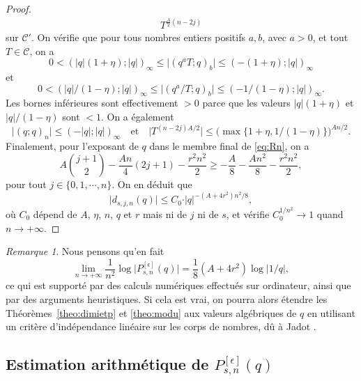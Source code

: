 \documentclass[12pt]{amsart}
\newcommand{\io}{\infty}
\newcommand{\ep}{\epsilon}
\theoremstyle{remark}
\newtheorem*{remark}{Remarque}
\numberwithin{equation}{section}
\begin{document}
\begin{proof}
\begin{align}
 T^{ \frac{A }{2}(n-2 j) } 
\end{align}
sur $\mathcal{C'}$. On v{\'e}rifie que pour tous nombres entiers positifs
$a,b$, avec $a>0$, et tout $T\in\mathcal{C}$, on a  
$$
0<(\vert q\vert(1+\eta);\vert q\vert)_\infty\le
\vert(q^aT;q)_b\vert\le (-(1+\eta);\vert q\vert)_\infty
$$
et
$$
0<(\vert q\vert/(1-\eta);\vert q\vert)_\infty\le
\vert(q^a/T;q)_b\vert\le (-1/(1-\eta);\vert q\vert)_\infty.
$$
Les bornes inf{\'e}rieures sont effectivement $>0$ parce que les
valeurs $\vert q\vert(1+\eta)$ et $\vert q\vert/(1-\eta)$ sont $<1$.
On a {\'e}galement  
$$
\vert (q;q)_n\vert\le (-\vert q\vert;\vert q\vert)_\infty\quad
\text{et}\quad 
\vert T^{(n-2j)A/2}\vert \le \bigl(\max\{1+\eta,1/(1-\eta)\}\bigr)^{An/2}.
$$
Finalement, pour l'exposant de $q$ dans le membre final de 
\eqref{eq:Rn}, on a
$$A\binom {j+1}2- \frac{A n}{4} (2j+1) - \frac{ r^2n^2}{2}\ge 
-\frac {A} {8}-\frac {An^2} {8}- \frac{ r^2n^2}{2},$$
pour tout $j\in\{0,1, \cdots, n\}$. 
On en d{\'e}duit que 
$$
\vert d_{s,j,n}(q)\vert \le 
C_0\cdot\vert q\vert^{-(A+4r^2)n^2/8},
$$
o{\`u} $C_0$ d{\'e}pend de $A$, $\eta$, $n$, $q$ et $r$ mais  ni de $j$ ni de $s$, et v{\'e}rifie 
$C_0^{1/n^2}\to 1$ quand $n\to +\io$. 
\end{proof}

\begin{remark}
Nous pensons qu'en fait 
$$\lim_{n\to+\infty}\frac{1}{n^2}\log\vert P_{s,n}^{[\ep]}(q)\vert =
\frac18(A+4r^2)\log \vert 1/q\vert,$$
ce qui est support{\'e} par des calculs num{\'e}riques effectu{\'e}s sur
ordinateur, ainsi que par des arguments
heuristiques. Si cela est vrai, on pourra alors {\'e}tendre les
Th{\'e}or{\`e}mes~\ref{theo:dimietp} et \ref{theo:modu} aux valeurs
alg{\'e}briques de $q$ en utilisant un crit{\`e}re d'ind{\'e}pendance
lin{\'e}aire sur les corps de nombres, d{\^u} {\`a} Jadot \cite{jadot}.
\end{remark}


\subsection{Estimation arithm{\'e}tique de $P_{s,n}^{[\ep]}(q)$} 
\label{ssec:arith}
\end{document}
